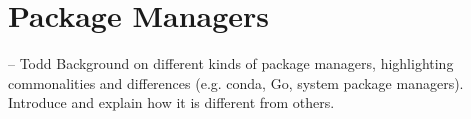 \section{Package Managers}

-- Todd
Background on different kinds of package managers, highlighting commonalities and differences (e.g. conda, Go, system package managers). Introduce \spack and explain how it is different from others.
